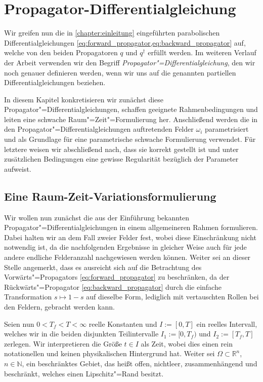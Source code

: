 \documentclass[../main.tex]{subfiles}
\begin{document}
\chapter{Propagator-Differentialgleichung} %
\label{chapter:propagator_differentialgleichung}

Wir greifen nun die in \cref{chapter:einleitung} eingeführten parabolischen Differentialgleichungen \cref{eq:forward_propagator,eq:backward_propagator} auf, welche von den beiden Propagatoren $q$ und $q^{\dagger}$ erfüllt werden.
Im weiteren Verlauf der Arbeit verwenden wir den Begriff \emph{Propagator"=Differentialgleichung}, den wir noch genauer definieren werden, wenn wir uns
auf die genannten partiellen Differentialgleichungen beziehen.

In diesem Kapitel konkretisieren wir zunächst diese Propagator"=Differentialgleichungen, schaffen geeignete Rahmenbedingungen und leiten eine schwache Raum"=Zeit"=Formulierung her.
Anschließend werden die in den Propagator"=Differentialgleichungen auftretenden Felder $\omega_{i}$ parametrisiert und als Grundlage für eine parametrische schwache Formulierung verwendet.
Für letztere weisen wir abschließend nach, dass sie korrekt gestellt ist und unter zusätzlichen Bedingungen eine gewisse Regularität bezüglich der Parameter aufweist.


\section{Eine Raum-Zeit-Variationsformulierung}
\label{section:raum_zeit_variationsformulierung}

Wir wollen nun zunächst die aus der Einführung bekannten Propagator"=Differentialgleichungen in einem allgemeineren Rahmen formulieren.
Dabei halten wir an dem Fall zweier Felder fest, wobei diese Einschränkung nicht notwendig ist, da die nachfolgenden Ergebnisse in gleicher Weise auch für jede andere endliche Felderanzahl nachgewiesen werden können.
Weiter sei an dieser Stelle angemerkt, dass es ausreicht sich auf die Betrachtung des Vorwärts"=Propagators \cref{eq:forward_propagator} zu beschränken, da der Rückwärts"=Propagator \cref{eq:backward_propagator} durch die einfache Transformation $s \mapsto 1 - s$ auf dieselbe Form, lediglich mit vertauschten Rollen bei den Feldern, gebracht werden kann.

Seien nun $0 < T_{f} < T < \infty$ reelle Konstanten und $I := [0, T]$ ein reelles Intervall, welches wir in die beiden disjunkten Teilintervalle $I_{1} := [0, T_{f})$ und $I_{2} := [T_{f}, T]$ zerlegen.
Wir interpretieren die Größe $t \in I$ als Zeit, wobei dies einen rein notationellen und keinen physikalischen Hintergrund hat.
Weiter sei $\Omega \subset \mathbb{R}^{n}$, $n \in \mathbb{N}$, ein beschränktes Gebiet, das heißt offen, nichtleer, zusammenhängend und beschränkt, welches einen Lipschitz"=Rand besitzt.
\end{document}
